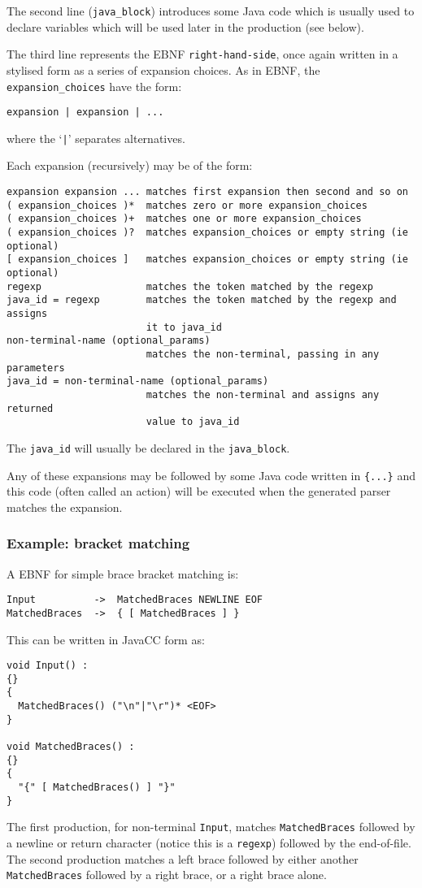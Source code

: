 \documentclass{article}
\begin{document}
The second line (\verb+java_block+) introduces some Java code which is usually
used to declare variables which will be used later in the
production (see below).

The third line represents the EBNF \verb+right-hand-side+, once again written
in a stylised form as a series of expansion choices.
As in EBNF, the \verb+expansion_choices+ have the form:
\begin{verbatim}
expansion | expansion | ...
\end{verbatim}
where the `\verb+|+' separates alternatives. 

Each expansion (recursively) may be of the form:
\begin{verbatim}
expansion expansion ... matches first expansion then second and so on
( expansion_choices )*  matches zero or more expansion_choices
( expansion_choices )+  matches one or more expansion_choices
( expansion_choices )?  matches expansion_choices or empty string (ie optional)
[ expansion_choices ]   matches expansion_choices or empty string (ie optional)
regexp                  matches the token matched by the regexp
java_id = regexp        matches the token matched by the regexp and assigns
                        it to java_id
non-terminal-name (optional_params)
                        matches the non-terminal, passing in any parameters
java_id = non-terminal-name (optional_params)
                        matches the non-terminal and assigns any returned
                        value to java_id
\end{verbatim}
The \verb+java_id+ will usually be declared in the \verb+java_block+.

Any of these expansions may be followed by some Java code written in
\verb+{...}+ and this code (often called an action) will be executed 
when the generated parser matches the expansion.


\subsubsection*{Example: bracket matching}

A EBNF for simple brace bracket matching is:
\begin{verbatim}
Input          ->  MatchedBraces NEWLINE EOF
MatchedBraces  ->  { [ MatchedBraces ] } 
\end{verbatim}
This can be written in JavaCC form as:
\begin{verbatim}
void Input() :
{}
{
  MatchedBraces() ("\n"|"\r")* <EOF>
}

void MatchedBraces() :
{}
{
  "{" [ MatchedBraces() ] "}"
}
\end{verbatim}
The first production, for non-terminal \verb+Input+, matches
\verb+MatchedBraces+ followed by a newline or return character
(notice this is a \verb+regexp+) followed by the end-of-file.
The second production matches a left brace followed
by either another \verb+MatchedBraces+ followed by a right
brace, or a right brace alone.
\end{document}
